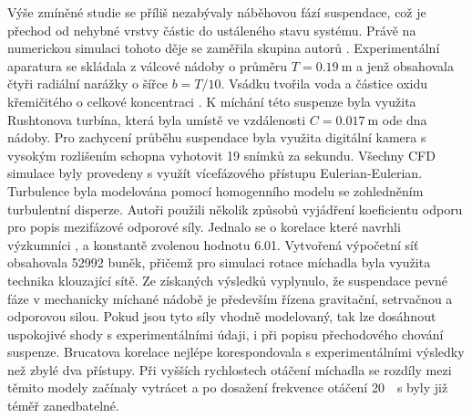 Výše zmíněné studie se příliš nezabývaly náběhovou fází suspendace, což je přechod od nehybné vrstvy částic do ustáleného stavu systému. Právě na numerickou simulaci tohoto děje se zaměřila skupina autorů \citet{tamb09}. Experimentální aparatura se skládala z válcové nádoby o průměru $T=\SI{0.19}{\meter}$ a jenž obsahovala čtyři radiální narážky o šířce $b=T/10$. Vsádku tvořila voda a částice oxidu křemičitého o celkové koncentraci . K míchání této suspenze byla využita Rushtonova turbína, která byla umístě ve vzdálenosti $C=\SI{0.017}{\meter}$ ode dna nádoby. Pro zachycení průběhu suspendace byla využita digitální kamera s vysokým rozlišením schopna vyhotovit \num{19} snímků za sekundu. Všechny CFD simulace byly provedeny s využít vícefázového přístupu Eulerian-Eulerian. Turbulence byla modelována pomocí homogenního \keps{} modelu se zohledněním turbulentní disperze. Autoři použili několik způsobů vyjádření koeficientu odporu pro popis mezifázové odporové síly. Jednalo se o korelace které navrhli výzkumníci \citet{cli78}, \citet{bru98} a konstantě zvolenou hodnotu \num{6.01}. Vytvořená výpočetní síť obsahovala \num{52992} buněk, přičemž pro simulaci rotace míchadla byla využita technika klouzající sítě. Ze získaných výsledků vyplynulo, že suspendace pevné fáze v mechanicky míchané nádobě je především řízena gravitační, setrvačnou a odporovou silou. Pokud jsou tyto síly vhodně modelovaný, tak lze dosáhnout uspokojivé shody s experimentálními údaji, i při popisu přechodového chování suspenze. Brucatova korelace nejlépe korespondovala s experimentálními výsledky než zbylé dva přístupy. Při vyšších rychlostech otáčení míchadla se rozdíly mezi těmito modely začínaly vytrácet a po dosažení frekvence otáčení \SI{20}{\per\second} byly již téměř zanedbatelné.


